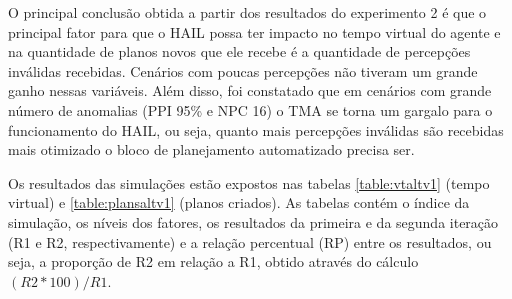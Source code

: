 O principal conclusão obtida a partir dos resultados do experimento 2 é que o principal fator para que o HAIL possa ter impacto no tempo virtual do agente e na quantidade de planos novos que ele recebe é a quantidade de percepções inválidas recebidas. Cenários com poucas percepções não tiveram um grande ganho nessas variáveis. Além disso, foi constatado que em cenários com grande número de anomalias (PPI 95\% e NPC 16) o TMA se torna um gargalo para o funcionamento do HAIL, ou seja, quanto mais percepções inválidas são recebidas mais otimizado o bloco de planejamento automatizado precisa ser.

Os resultados das simulações estão expostos nas tabelas \ref{table:vtaltv1} (tempo virtual) e \ref{table:plansaltv1} (planos criados). As tabelas contém o índice da simulação, os níveis dos fatores, os resultados da primeira e da segunda iteração (R1 e R2, respectivamente) e a relação percentual (RP) entre os resultados, ou seja, a proporção de R2 em relação a R1, obtido através do cálculo $(R2 * 100) / R1$.

